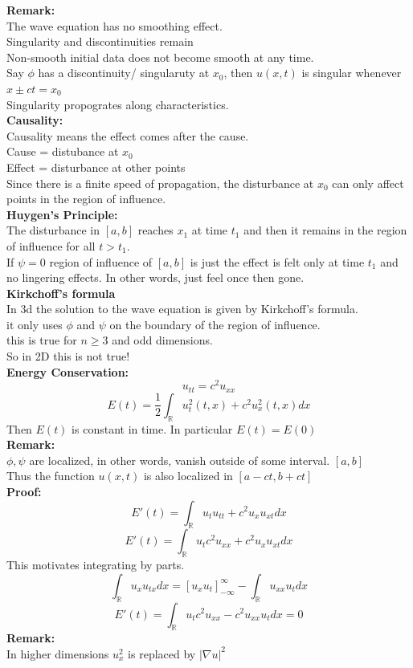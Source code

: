 \documentclass{article}
\begin{document}
\textbf{Remark:} \\
The wave equation has no smoothing effect.\\
Singularity and discontinuities remain \\
Non-smooth initial data does not become smooth at any time.\\
Say $\phi$ has a discontinuity/ singularuty at $x_0$, then $u(x,t)$ is singular whenever $x \pm ct = x_0$\\
Singularity propogrates along characteristics.\\

\textbf{Causality: }\\
Causality means the effect comes after the cause.\\
Cause = distubance at $x_0$\\
Effect = disturbance at other points\\
Since there is a finite speed of propagation, the disturbance at $x_0$ can only affect points in the region of influence.\\

\textbf{Huygen's Principle:} \\
The disturbance in $[a,b]$ reaches $x_1$ at time $t_1$ and then it remains in the region of influence for all $t > t_1$.\\
If $\psi = 0$ region of influence of $[a,b]$ is just the effect is felt only at time $t_1$ and no lingering effects. In other words, just feel once then gone.\\
\textbf{Kirkchoff's formula}\\
In 3d the solution to the wave equation is given by Kirkchoff's formula.\\
it only uses $\phi$ and $\psi$ on the boundary of the region of influence.\\
this is true for $n \geq 3$ and odd dimensions.\\
So in 2D this is not true! \\

\textbf{Energy Conservation:}\\
$$ u_{tt} = c^2 u_{xx}$$
$$ E(t) = \frac{1}{2} \int_{\mathds{R}}u_t^2(t,x) + c^2 u_x^2(t,x) dx$$
Then $E(t)$ is constant in time. In particular $E(t) = E(0)$\\
\textbf{Remark:} \\
$\phi, \psi$ are localized, in other words, vanish outside of some interval. $[a,b]$\\
Thus the function $u(x,t)$ is also localized in $[a-ct,b+ct]$\\
\textbf{Proof:}\\
$$ E'(t) = \int_{\mathds{R}} u_t u_{tt} + c^2 u_x u_{xt} dx$$
$$ E'(t) = \int_{\mathds{R}} u_t c^2 u_{xx} + c^2 u_x u_{xt} dx$$
This motivates integrating by parts.\\
$$ \int_{\mathds{R}} u_x u_{tx} dx = \left[ u_x u_t \right]_{-\infty}^{\infty} - \int_{\mathds{R}} u_{xx} u_t dx$$
$$ E'(t) = \int_{\mathds{R}} u_t c^2 u_{xx} - c^2 u_{xx} u_t dx = 0$$
\textbf{Remark:} \\
In higher dimensions $u_x^2$ is replaced by $|\nabla u|^2$\\
\end{document}
